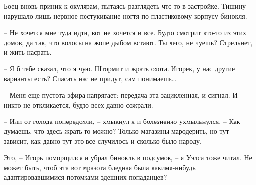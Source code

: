 \documentclass[a4paper]{book}
\begin{document}
Боец вновь приник к окулярам, пытаясь разглядеть что-то в застройке. Тишину нарушало лишь нервное постукивание ногтя по пластиковому корпусу бинокля. 

-- Не хочется мне туда идти, вот не хочется и все. Будто смотрит кто-то из этих домов, да так, что волосы на жопе дыбом встают. Ты чего, не чуешь? Стрельнет, и жить насрать. 

-- Я б тебе сказал, что я чую. Штормит и жрать охота. Игорек, у нас другие варианты есть? Спасать нас не придут, сам понимаешь\ldots

-- Меня еще пустота эфира напрягает: передача эта зацикленная, и сигнал. И никто не откликается, будто всех давно сожрали. 

-- Или от голода попередохли, -- хмыкнул я и болезненно ухмыльнулся. -- Как думаешь, что здесь жрать-то можно? Только магазины мародерить, но тут зависит, как давно тут это все случилось и сколько было народу.

Это, -- Игорь поморщился и убрал бинокль в подсумок, -- я Уэлса тоже читал. Не может быть, чтоб эта вот мразота бледная была какими-нибудь адаптировавшимися потомками здешних попаданцев? 
\end{document}
